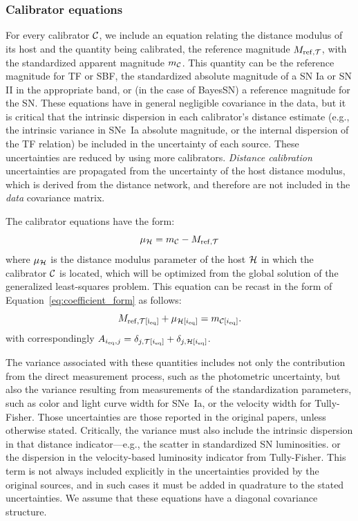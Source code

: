 \subsubsection {Calibrator equations}
\label {sec:eq_calib}

For every calibrator $ \icalib $, we include an equation relating the distance modulus of its host and the quantity being calibrated, the reference magnitude $ M_{\rm ref, \itype} $, with the standardized apparent magnitude $ m_{\icalib } $.  This quantity can be the reference magnitude for TF or SBF, the standardized absolute magnitude of a SN Ia or SN II in the appropriate band, or (in the case of BayesSN) a reference magnitude for the SN. These equations have in general negligible covariance in the data, but it is critical that the intrinsic dispersion in each calibrator's distance estimate (e.g., the intrinsic variance in SNe~Ia absolute magnitude, or the internal dispersion of the TF relation) be included in the uncertainty of each source.  These uncertainties are reduced by using more calibrators. \textit{Distance calibration} uncertainties are propagated from the uncertainty of the host distance modulus, which is derived from the distance network, and therefore are not included in the \textit{data} covariance matrix.

The calibrator equations have the form:
\begin{equation}
    \mu_{\ihost} = m_{\icalib}- M_{\rm ref, \itype}
\end{equation}
where $ \mu_{\ihost} $ is the distance modulus parameter of the host $ \ihost $ in which the calibrator $ \icalib $ is located, which will be optimized from the global solution of the generalized least-squares problem. This equation can be recast in the form of Equation~\ref{eq:coefficient_form} as follows:
\begin{equation}
    M_{\rm ref, \itype[\ieq]} + \mu_{\ihost[\ieq]} = m_{\icalib[\ieq]}.
\end{equation}
with correspondingly $A_{\ieq, j} = \delta_{j, \itype[\ieq]} + \delta_{j, \ihost[\ieq]}$.

The variance associated with these quantities includes not only the contribution from the direct measurement process, such as the photometric uncertainty, but also the variance resulting from measurements of the standardization parameters, such as color and light curve width for SNe~Ia, or the velocity width for Tully-Fisher.  Those uncertainties are those reported in the original papers, unless otherwise stated.  Critically, the variance must also include the intrinsic dispersion in that distance indicator---e.g., the scatter in standardized SN luminosities. or the dispersion in the velocity-based luminosity indicator from Tully-Fisher.  This term is not always included explicitly in the  uncertainties provided by the original sources, and in such cases it must be added in quadrature to the stated uncertainties. We assume that these equations have a diagonal covariance structure.

